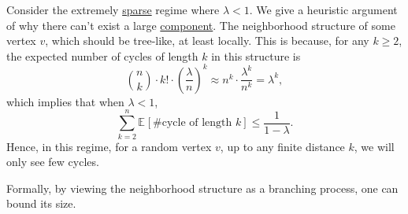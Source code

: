 \begin{intuition}
	Consider the extremely \hyperref[def:sparse-graph]{sparse} regime where \(\lambda < 1\). We give a heuristic argument of why there can't exist a large \hyperref[def:connected-component]{component}. The neighborhood structure of some vertex \(v\), which should be tree-like, at least locally. This is because, for any \(k \geq 2\), the expected number of cycles of length \(k\) in this structure is
	\[
		\binom{n}{k} \cdot k! \cdot \left( \frac{\lambda}{n} \right) ^k
		\approx n^k \cdot \frac{\lambda ^k}{n^k}
		= \lambda ^k,
	\]
	which implies that when \(\lambda < 1\),
	\begin{equation}\label{eq:Erdős-Rényi-graph-extremely-sparse-cycle-count}
		\sum_{k=2}^{n} \mathbb{E}_{}[\# \text{cycle of length } k]
		\leq \frac{1}{1 - \lambda }.
	\end{equation}
	Hence, in this regime, for a random vertex \(v\), up to any finite distance \(k\), we will only see few cycles.
	\begin{center}
	\end{center}
\end{intuition}

Formally, by viewing the neighborhood structure as a branching process, one can bound its size.